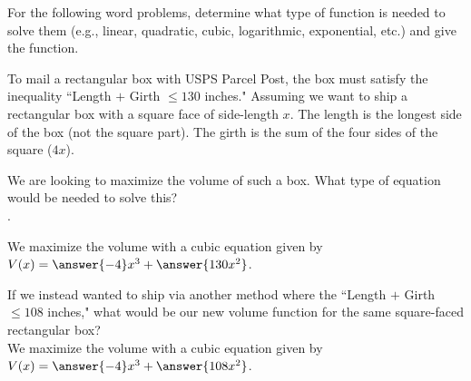 \documentclass{ximera}
\author{Elizabeth Campolongo}
\begin{document}
\begin{exercise}
For the following word problems, determine what type of function is needed to solve them (e.g., linear, quadratic, cubic, logarithmic, exponential, etc.) and give the function. 
%



\item To mail a rectangular box with USPS Parcel Post, the box must satisfy the inequality ``Length $+$ Girth $\leq 130$ inches." Assuming we want to ship a rectangular box with a square face of side-length $x$. The length is the longest side of the box (not the square part). The girth is the sum of the four sides of the square ($4x$).

We are looking to maximize the volume of such a box. What type of equation would be needed to solve this?\\
.
%
\begin{exercise}
We maximize the volume with a cubic equation given by $V(x) = \answer{-4}x^3+\answer{130x^2}$.
\begin{exercise}
If we instead wanted to ship via another method where the ``Length $+$ Girth $\leq 108$ inches," what would be our new volume function for the same square-faced rectangular box?\\
We maximize the volume with a cubic equation given by $V(x) = \answer{-4}x^3+\answer{108x^2}$.
\end{exercise}
\end{exercise}


\end{exercise}
\end{document}
